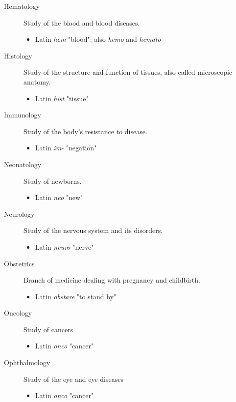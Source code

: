 \documentclass[11pt]{article}
\begin{document}
\begin{description}
\item[{Hematology}] Study of the blood and blood diseases.
\begin{itemize}
\item Latin \emph{hem} "blood"; also \emph{hemo} and \emph{hemato}
\end{itemize}

\item[{Histology}] Study of the structure and function of tissues, also called
microscopic anatomy.
\begin{itemize}
\item Latin \emph{hist} "tissue"
\end{itemize}

\item[{Immunology}] Study of the body's resistance to disease.
\begin{itemize}
\item Latin \emph{im-} "negation"
\end{itemize}

\item[{Neonatology}] Study of newborns. 
\begin{itemize}
\item Latin \emph{neo} "new"
\end{itemize}

\item[{Neurology}] Study of the nervous system and its disorders.
\begin{itemize}
\item Latin \emph{neuro} "nerve"
\end{itemize}

\item[{Obstetrics}] Branch of medicine dealing with pregnancy and childbirth.
\begin{itemize}
\item Latin \emph{obstare} "to stand by"
\end{itemize}

\item[{Oncology}] Study of cancers
\begin{itemize}
\item Latin \emph{onco} "cancer"
\end{itemize}

\item[{Ophthalmology}] Study of the eye and eye diseases
\begin{itemize}
\item Latin \emph{onco} "cancer"
\end{itemize}


\end{description}
\end{document}
